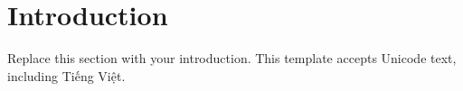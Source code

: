 \section{Introduction}

Replace this section with your introduction. This template accepts Unicode text, including Tiếng Việt.
